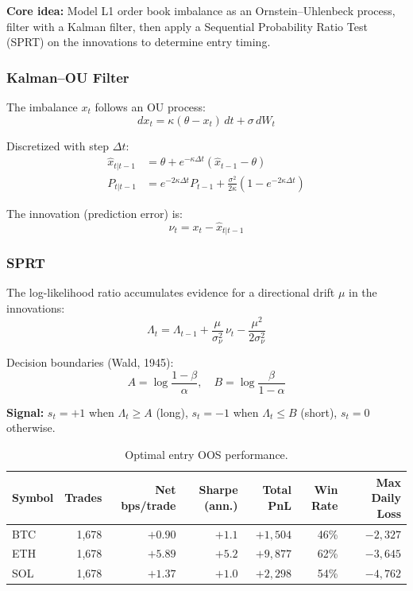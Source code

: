 \documentclass[11pt,a4paper]{article}
\newcommand{\toprule}{\hline\hline}
\newcommand{\midrule}{\hline}
\newcommand{\bottomrule}{\hline\hline}
\begin{document}
\textbf{Core idea:} Model L1 order book imbalance as an Ornstein--Uhlenbeck process, filter with a Kalman filter, then apply a Sequential Probability Ratio Test (SPRT) on the innovations to determine entry timing.

\subsubsection*{Kalman--OU Filter}

The imbalance $x_t$ follows an OU process:
\begin{equation}
dx_t = \kappa(\theta - x_t)\,dt + \sigma\,dW_t
\end{equation}

Discretized with step $\Delta t$:
\begin{align}
\hat{x}_{t|t-1} &= \theta + e^{-\kappa \Delta t}(\hat{x}_{t-1} - \theta) \\
P_{t|t-1} &= e^{-2\kappa \Delta t} P_{t-1} + \frac{\sigma^2}{2\kappa}(1 - e^{-2\kappa \Delta t})
\end{align}

The innovation (prediction error) is:
\begin{equation}
\nu_t = x_t - \hat{x}_{t|t-1}
\end{equation}

\subsubsection*{SPRT}

The log-likelihood ratio accumulates evidence for a directional drift $\mu$ in the innovations:
\begin{equation}
\Lambda_t = \Lambda_{t-1} + \frac{\mu}{\sigma_\nu^2}\,\nu_t - \frac{\mu^2}{2\sigma_\nu^2}
\end{equation}

Decision boundaries (Wald, 1945):
\begin{equation}
A = \log\!\frac{1-\beta}{\alpha}, \quad B = \log\!\frac{\beta}{1-\alpha}
\end{equation}

\textbf{Signal:} $s_t = +1$ when $\Lambda_t \geq A$ (long), $s_t = -1$ when $\Lambda_t \leq B$ (short), $s_t = 0$ otherwise.

\begin{table}[h!]
\centering
\caption{Optimal entry OOS performance.}
\begin{tabular}{@{}lrrrrrr@{}}
\toprule
Symbol & Trades & Net bps/trade & Sharpe (ann.) & Total PnL & Win Rate & Max Daily Loss \\
\midrule
BTC & 1{,}678 & $+0.90$ & $+1.1$ & $+1{,}504$ & 46\% & $-2{,}327$ \\
ETH & 1{,}678 & $+5.89$ & $+5.2$ & $+9{,}877$ & 62\% & $-3{,}645$ \\
SOL & 1{,}678 & $+1.37$ & $+1.0$ & $+2{,}298$ & 54\% & $-4{,}762$ \\
\bottomrule
\end{tabular}
\end{table}
\end{document}
